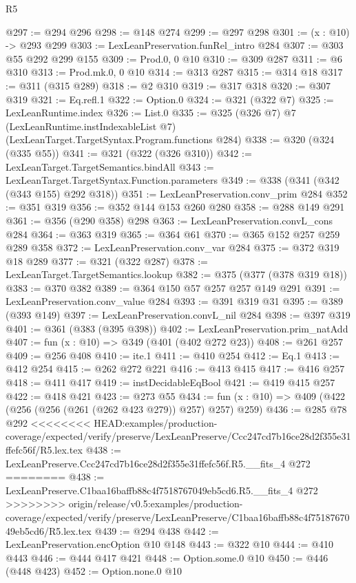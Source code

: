 \begin{lexlean}{R5}
\begin{coremodule}
{{{{{{{{{@297 := @294 @296
@298 := @148 @274
@299 := @297 @298
@301 := (x : @10) -> @293 @299
@303 := LexLeanPreservation.funRel_intro @284
@307 := @303 @55 @292 @299 @155
@309 := Prod.{0, 0} @10
@310 := @309 @287
@311 := @6 @310
@313 := Prod.mk.{0, 0} @10
@314 := @313 @287
@315 := @314 @18
@317 := @311 (@315 @289)
@318 := @2 @310
@319 := @317 @318
@320 := @307 @319
@321 := Eq.refl.{1}
@322 := Option.{0}
@324 := @321 (@322 @7)
@325 := LexLeanRuntime.index
@326 := List.{0}
@335 := @325
    (@326 @7)
    @7
    (LexLeanRuntime.instIndexableList @7)
    (LexLeanTarget.TargetSyntax.Program.functions @284)
@338 := @320 (@324 (@335 @55))
@341 := @321 (@322 (@326 @310))
@342 := LexLeanTarget.TargetSemantics.bindAll
@343 := LexLeanTarget.TargetSyntax.Function.parameters
@349 := @338 (@341 (@342 (@343 @155) @292 @318))
@351 := LexLeanPreservation.conv_prim @284
@352 := @351 @319
@356 := @352 @144 @153 @260 @280
@358 := @288 @149 @291
@361 := @356 (@290 @358) @298
@363 := LexLeanPreservation.convL_cons @284
@364 := @363 @319
@365 := @364 @61
@370 := @365 @152 @257 @259 @289 @358
@372 := LexLeanPreservation.conv_var @284
@375 := @372 @319 @18 @289
@377 := @321 (@322 @287)
@378 := LexLeanTarget.TargetSemantics.lookup
@382 := @375 (@377 (@378 @319 @18))
@383 := @370 @382
@389 := @364 @150 @57 @257 @257 @149 @291
@391 := LexLeanPreservation.conv_value @284
@393 := @391 @319 @31
@395 := @389 (@393 @149)
@397 := LexLeanPreservation.convL_nil @284
@398 := @397 @319
@401 := @361 (@383 (@395 @398))
@402 := LexLeanPreservation.prim_natAdd
@407 := fun (x : @10) => @349 (@401 (@402 @272 @23))
@408 := @261 @257
@409 := @256 @408
@410 := ite.{1}
@411 := @410 @254
@412 := Eq.{1}
@413 := @412 @254
@415 := @262 @272 @221
@416 := @413 @415
@417 := @416 @257
@418 := @411 @417
@419 := instDecidableEqBool
@421 := @419 @415 @257
@422 := @418 @421
@423 := @273 @55
@434 := fun (x : @10) => @409 (@422 (@256 (@256 (@261 (@262 @423 @279)) @257) @257) @259)
@436 := @285 @78 @292
<<<<<<<< HEAD:examples/production-coverage/expected/verify/preserve/LexLeanPreserve/Ccc247cd7b16ce28d2f355e31ffefc56f/R5.lex.tex
@438 := LexLeanPreserve.Ccc247cd7b16ce28d2f355e31ffefc56f.R5.__fits_4 @272
========
@438 := LexLeanPreserve.C1baa16baffb88c4f7518767049eb5cd6.R5.__fits_4 @272
>>>>>>>> origin/release/v0.5:examples/production-coverage/expected/verify/preserve/LexLeanPreserve/C1baa16baffb88c4f7518767049eb5cd6/R5.lex.tex
@439 := @294 @438
@442 := LexLeanPreservation.encOption @10 @148
@443 := @322 @10
@444 := @410 @443
@446 := @444 @417 @421
@448 := Option.some.{0} @10
@450 := @446 (@448 @423)
@452 := Option.none.{0} @10
}}}}}}}}}
\end{coremodule}
\end{lexlean}
